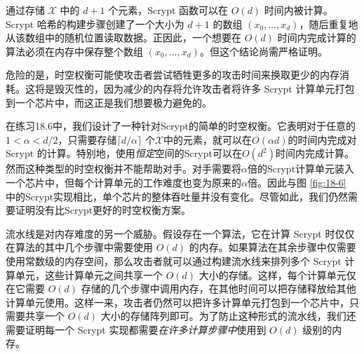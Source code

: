 \begin{snote}
通过存储 $\mathcal{X}$ 中的 $d+1$ 个元素，Scrypt 函数可以在 $O(d)$ 时间内被计算。Scrypt 哈希的构建步骤创建了一个大小为 $d+1$ 的数组 $(x_0,\dots,x_d)$，随后重复地从该数组中的随机位置读取数据。正因此，一个想要在 $O(d)$ 时间内完成计算的算法必须在内存中保存整个数组 $(x_0,\dots,x_d)$。但这个结论尚需严格证明。

危险的是，时空权衡可能使攻击者尝试牺牲更多的攻击时间来换取更少的内存消耗。这将是毁灭性的，因为减少的内存将允许攻击者将许多 Scrypt 计算单元打包到一个芯片中，而这正是我们想要极力避免的。

在练习18.6中，我们设计了一种针对Scrypt的简单的时空权衡。它表明对于任意的$1<\alpha<d/2$，只需要存储$\lceil d/\alpha\rceil$ 个$\mathcal{X}$中的元素，就可以在$O(\alpha d)$的时间内完成对 Scrypt 的计算。特别地，使用\emph{恒定}空间的Scrypt可以在$O(d^2)$时间内完成计算。然而这种类型的时空权衡并不能帮助对手。对手需要将$\alpha$倍的Scrypt计算单元装入一个芯片中，但每个计算单元的工作难度也变为原来的$\alpha$倍。因此与图 \ref{fig:18-6} 中的Scrypt实现相比，单个芯片的整体吞吐量并没有变化。尽管如此，我们仍然需要证明没有比Scrypt更好的时空权衡方案。

流水线是对内存难度的另一个威胁。假设存在一个算法，它在计算 Scrypt 时仅仅在算法的其中几个步骤中需要使用 $O(d)$ 的内存。如果算法在其余步骤中仅需要使用常数级的内存空间，那么攻击者就可以通过构建流水线来排列多个 Scrypt 计算单元，这些计算单元之间共享一个 $O(d)$ 大小的存储。这样，每个计算单元仅在它需要 $O(d)$ 存储的几个步骤中调用内存，在其他时间可以把存储释放给其他计算单元使用。这样一来，攻击者仍然可以把许多计算单元打包到一个芯片中，只需要共享一个 $O(d)$ 大小的存储阵列即可。为了防止这种形式的流水线，我们还需要证明每一个 Scrypt 实现都需要\emph{在许多计算步骤中}使用到 $O(d)$ 级别的内存。
\end{snote}

